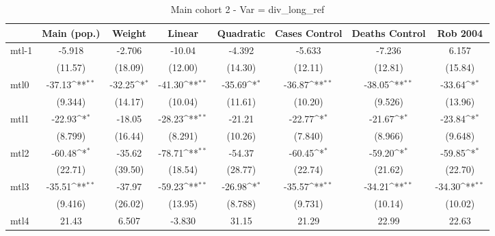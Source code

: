 \documentclass{article}
\begin{document}
{
\def\sym#1{\ifmmode^{#1}\else\(^{#1}\)\fi}
\begin{longtable}{l*{7}{c}}
\caption{Main cohort 2 - Var = div\_long\_ref}\\
\hline\hline\endfirsthead\hline\endhead\hline\endfoot\endlastfoot
                &\multicolumn{1}{c}{Main (pop.)}&\multicolumn{1}{c}{Weight}&\multicolumn{1}{c}{Linear}&\multicolumn{1}{c}{Quadratic}&\multicolumn{1}{c}{Cases Control}&\multicolumn{1}{c}{Deaths Control}&\multicolumn{1}{c}{Rob 2004}\\
\hline
mtl-1           &   -5.918         &   -2.706         &   -10.04         &   -4.392         &   -5.633         &   -7.236         &    6.157         \\
                &  (11.57)         &  (18.09)         &  (12.00)         &  (14.30)         &  (12.11)         &  (12.81)         &  (15.84)         \\
mtl0            &   -37.13\sym{**} &   -32.25\sym{*}  &   -41.30\sym{**} &   -35.69\sym{*}  &   -36.87\sym{**} &   -38.05\sym{**} &   -33.64\sym{*}  \\
                &  (9.344)         &  (14.17)         &  (10.04)         &  (11.61)         &  (10.20)         &  (9.526)         &  (13.96)         \\
mtl1            &   -22.93\sym{*}  &   -18.05         &   -28.23\sym{**} &   -21.21         &   -22.77\sym{*}  &   -21.67\sym{*}  &   -23.84\sym{*}  \\
                &  (8.799)         &  (16.44)         &  (8.291)         &  (10.26)         &  (7.840)         &  (8.966)         &  (9.648)         \\
mtl2            &   -60.48\sym{*}  &   -35.62         &   -78.71\sym{**} &   -54.37         &   -60.45\sym{*}  &   -59.20\sym{*}  &   -59.85\sym{*}  \\
                &  (22.71)         &  (39.50)         &  (18.54)         &  (28.77)         &  (22.74)         &  (21.62)         &  (22.70)         \\
mtl3            &   -35.51\sym{**} &   -37.97         &   -59.23\sym{**} &   -26.98\sym{*}  &   -35.57\sym{**} &   -34.21\sym{**} &   -34.30\sym{**} \\
                &  (9.416)         &  (26.02)         &  (13.95)         &  (8.788)         &  (9.731)         &  (10.14)         &  (10.02)         \\
mtl4            &    21.43         &    6.507         &   -3.830         &    31.15         &    21.29         &    22.99         &    22.63         \\

\end{longtable}}
\end{document}
